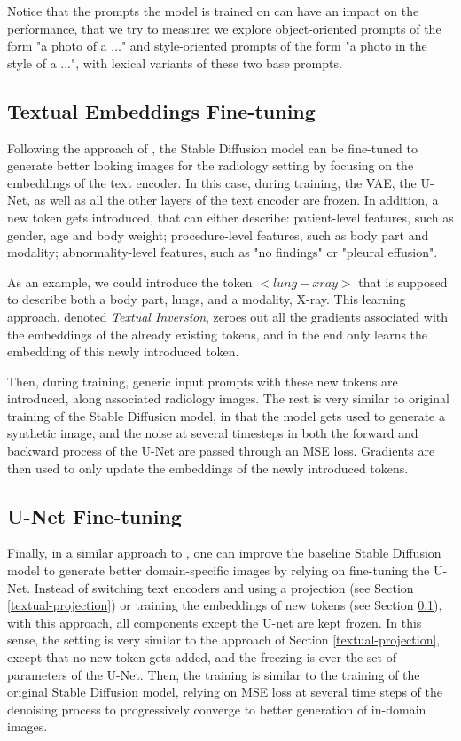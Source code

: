 \documentclass{article}
\begin{document}
Notice that the prompts the model is trained on can have an impact on the performance, that we try to measure: we explore object-oriented prompts of the form "a photo of a ..." and style-oriented prompts of the form "a photo in the style of a ...", with lexical variants of these two base prompts.

\subsection{Textual Embeddings Fine-tuning}
\label{textual-inversion}

Following the approach of \cite{https://doi.org/10.48550/arxiv.2208.01618}, the Stable Diffusion model can be fine-tuned to generate better looking images for the radiology setting by focusing on the embeddings of the text encoder. In this case, during training, the VAE, the U-Net, as well as all the other layers of the text encoder are frozen. In addition, a new token gets introduced, that can either describe: patient-level features, such as gender, age and body weight; procedure-level features, such as body part and modality; abnormality-level features, such as "no findings" or "pleural effusion".

As an example, we could introduce the token $<lung-xray>$ that is supposed to describe both a body part, lungs, and a modality, X-ray. This learning approach, denoted \textit{Textual Inversion}, zeroes out all the gradients associated with the embeddings of the already existing tokens, and in the end only learns the embedding of this newly introduced token.

Then, during training, generic input prompts with these new tokens are introduced, along associated radiology images. The rest is very similar to original training of the Stable Diffusion model, in that the model gets used to generate a synthetic image, and the noise at several timesteps in both the forward and backward process of the U-Net are passed through an MSE loss. Gradients are then used to only update the embeddings of the newly introduced tokens. 

\subsection{U-Net Fine-tuning}
\label{u-net-fine-tuning}

Finally, in a similar approach to \cite{https://doi.org/10.48550/arxiv.2208.12242}, one can improve the baseline Stable Diffusion model to generate better domain-specific images by relying on fine-tuning the U-Net. Instead of switching text encoders and using a projection (see Section \ref{textual-projection}) or training the embeddings of new tokens (see Section \ref{textual-inversion}), with this approach, all components except the U-net are kept frozen. In this sense, the setting is very similar to the approach of Section \ref{textual-projection}, except that no new token gets added, and the freezing is over the set of parameters of the U-Net. Then, the training is similar to the training of the original Stable Diffusion model, relying on MSE loss at several time steps of the denoising process to progressively converge to better generation of in-domain images.
\end{document}

